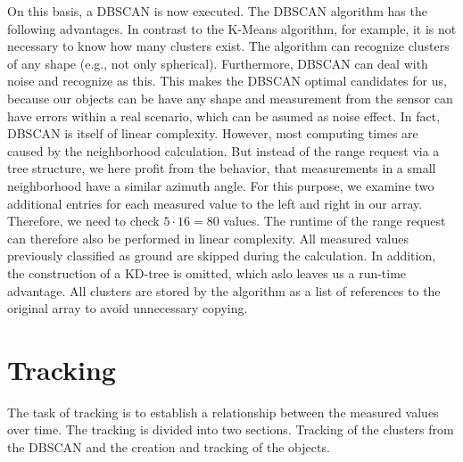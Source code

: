 \documentclass[11pt,oneside,openright]{mpreport}
\begin{document}
On this basis, a \ac{DBSCAN} \cite{DBSCAN} is now executed. The \ac{DBSCAN} algorithm has the following advantages. In contrast to the K-Means algorithm,
for example, it is not necessary to know how many clusters exist. The algorithm can recognize clusters of any shape (e.g., not only spherical).
Furthermore, \ac{DBSCAN} can deal with noise and recognize as this. This makes the \ac{DBSCAN} optimal candidates for us, because our objects can be have any shape and 
measurement from the sensor can have errors within a real scenario, which can be asumed as noise effect. 
In fact, \ac{DBSCAN} is itself of linear complexity. However, most computing times are caused by the neighborhood calculation.
But instead of the range request via a tree structure, we here profit from the behavior, that measurements in a small neighborhood have a similar azimuth angle.
For this purpose, we examine two additional entries for each measured value to the left and right in our array. 
Therefore, we need to check $5 \cdot 16 = 80$ values. The runtime of the range request can therefore also be performed in linear complexity.
All measured values previously classified as ground are skipped during the calculation. In addition, the construction of a KD-tree is omitted, which aslo leaves us a run-time advantage.
All clusters are stored by the algorithm as a list of references to the original array to avoid unnecessary copying.


\section{Tracking}
The task of tracking is to establish a relationship between the measured values over time. The tracking is divided into two sections.
Tracking of the clusters from the \ac{DBSCAN} and the creation and tracking of the objects.

\end{document}
